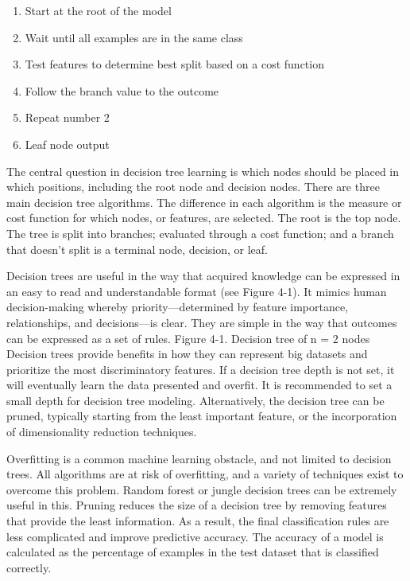 \documentclass[12pt]{article}
\begin{document}
\begin{enumerate}
\item Start at the root of the model
\item Wait until all examples are in the same class
\item Test features to determine best split based on a cost function
\item Follow the branch value to the outcome
\item Repeat number 2
\item Leaf node output
\end{enumerate}

The central question in decision tree learning is which nodes should be placed in which positions, including the root node and decision nodes. There are three main decision tree algorithms. The difference in each algorithm is the measure or cost function for which nodes, or features, are selected. The root is the top node. The tree is split into branches; evaluated through a cost function; and a branch that doesn’t split is a terminal node, decision, or leaf.

Decision trees are useful in the way that acquired knowledge can be expressed in an easy to read and understandable format (see Figure 4-1). It mimics human decision-making whereby priority—determined by feature importance, relationships, and decisions—is clear. They are simple in the way that outcomes can be expressed as a set of rules. Figure 4-1. Decision tree of n = 2 nodes
Decision trees provide benefits in how they can represent big datasets and prioritize the most discriminatory features. If a decision tree depth is not set, it will eventually learn the data presented and overfit. It is recommended to set a small depth for decision tree modeling. Alternatively, the decision tree can be pruned, typically starting from the least important feature, or the incorporation of dimensionality reduction techniques.

Overfitting is a common machine learning obstacle, and not limited to decision trees. All algorithms are at risk of overfitting, and a variety of techniques exist to overcome this problem. Random forest or jungle decision trees can be extremely useful in this. Pruning reduces the size of a decision tree by removing features that provide the least information. As a result, the final classification rules are
less complicated and improve predictive accuracy. The accuracy of a model is calculated as the percentage of examples in
the test dataset that is classified correctly.
\end{document}
